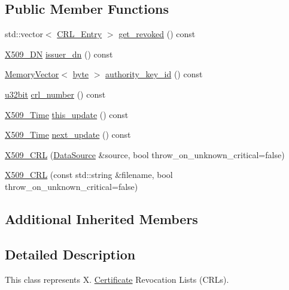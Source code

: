 \subsection*{Public Member Functions}
\begin{DoxyCompactItemize}
\item 
std\-::vector$<$ \hyperlink{classBotan_1_1CRL__Entry}{C\-R\-L\-\_\-\-Entry} $>$ \hyperlink{classBotan_1_1X509__CRL_a5345fb3a7ea9747421beac7c3ae5cdba}{get\-\_\-revoked} () const 
\item 
\hyperlink{classBotan_1_1X509__DN}{X509\-\_\-\-D\-N} \hyperlink{classBotan_1_1X509__CRL_ae97d321656a7c61beeaf12b106f49802}{issuer\-\_\-dn} () const 
\item 
\hyperlink{classBotan_1_1MemoryVector}{Memory\-Vector}$<$ \hyperlink{namespaceBotan_a7d793989d801281df48c6b19616b8b84}{byte} $>$ \hyperlink{classBotan_1_1X509__CRL_a5c1b944f8cafefaddf6116177bb1740f}{authority\-\_\-key\-\_\-id} () const 
\item 
\hyperlink{namespaceBotan_aacc7d03c95e97e76168fc1c819031830}{u32bit} \hyperlink{classBotan_1_1X509__CRL_a869a6219a80f08fb76a72a8aab4e34ba}{crl\-\_\-number} () const 
\item 
\hyperlink{classBotan_1_1X509__Time}{X509\-\_\-\-Time} \hyperlink{classBotan_1_1X509__CRL_a2af4a3f0264d042a335fc28d268bee1a}{this\-\_\-update} () const 
\item 
\hyperlink{classBotan_1_1X509__Time}{X509\-\_\-\-Time} \hyperlink{classBotan_1_1X509__CRL_aa838f557b397118a398f4511290cbfcf}{next\-\_\-update} () const 
\item 
\hyperlink{classBotan_1_1X509__CRL_a85e8d4ad0c908ed74a9fcec140bdfb4f}{X509\-\_\-\-C\-R\-L} (\hyperlink{classBotan_1_1DataSource}{Data\-Source} \&source, bool throw\-\_\-on\-\_\-unknown\-\_\-critical=false)
\item 
\hyperlink{classBotan_1_1X509__CRL_a7136a26a420714151331feb91db1a3e0}{X509\-\_\-\-C\-R\-L} (const std\-::string \&filename, bool throw\-\_\-on\-\_\-unknown\-\_\-critical=false)
\end{DoxyCompactItemize}
\subsection*{Additional Inherited Members}


\subsection{Detailed Description}
This class represents X. \hyperlink{classBotan_1_1Certificate}{Certificate} Revocation Lists (C\-R\-Ls). 

